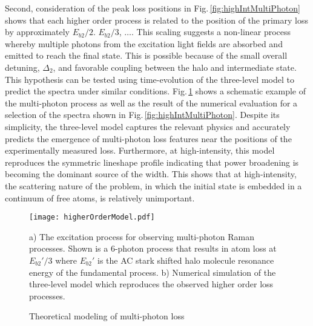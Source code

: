 Second, consideration of the peak loss positions in Fig.\,\ref{fig:highIntMultiPhoton} shows that each higher order process is related to the position of the primary loss by approximately $E_{b2}/2$. $E_{b2}/3$, $\dots$.
This scaling suggests a non-linear process whereby multiple photons from the excitation light fields are absorbed and emitted to reach the final state.
This is possible because of the small overall detuning, $\Delta_2$, and favorable coupling between the halo and intermediate state.
This hypothesis can be tested using time-evolution of the three-level model to predict the spectra under similar conditions.
Fig.\,\ref{fig:multiPhotonTheory} shows a schematic example of the multi-photon process as well as the result of the numerical evaluation for a selection of the spectra shown in Fig.\,\ref{fig:highIntMultiPhoton}.
Despite its simplicity, the three-level model captures the relevant physics and accurately predicts the emergence of multi-photon loss features near the positions of the experimentally measured loss.
Furthermore, at high-intensity, this model reproduces the symmetric lineshape profile indicating that power broadening is becoming the dominant source of the width.
This shows that at high-intensity, the scattering nature of the problem, in which the initial state is embedded in a continuum of free atoms, is relatively unimportant.
	\begin{figure} 
	\centerline{
	  \texttt{[image: higherOrderModel.pdf]}}
	  \caption{Theoretical modeling of multi-photon loss}{a) The excitation process for observing multi-photon Raman processes. Shown is a 6-photon process that results in atom loss at $E_{b2}'/3$ where $E_{b2}'$ is the AC stark shifted halo molecule resonance energy of the fundamental process. b) Numerical simulation of the three-level model which reproduces the observed higher order loss processes.}
	  \label{fig:multiPhotonTheory}
	\end{figure}




%
%
%
%
%
	
